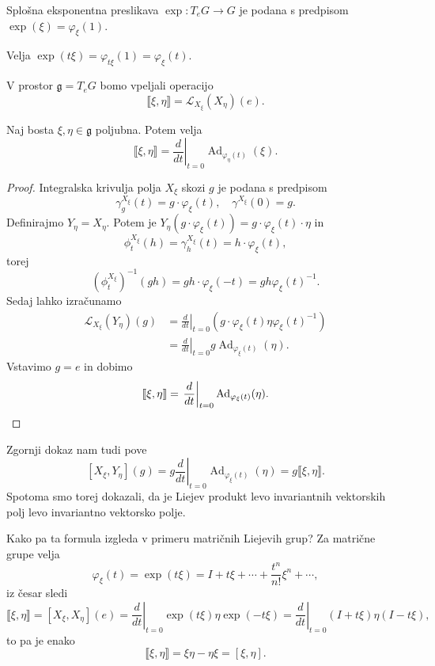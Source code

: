 \begin{definicija}
  Splošna eksponentna preslikava $\exp: T_e G \to G$ je podana s predpisom
  $\exp(\xi) = \varphi_\xi(1)$.
\end{definicija}

\begin{opomba}
  Velja $\exp(t \xi) = \varphi_{t \xi}(1) = \varphi_\xi(t)$.
\end{opomba}

V prostor $\mathfrak{g} = T_e G$ bomo vpeljali operacijo
\[
  \llbracket \xi, \eta \rrbracket
  = \mathcal{L}_{X_\xi} (X_\eta)(e).
\]

\begin{trditev}
  Naj bosta $\xi, \eta \in \mathfrak{g}$ poljubna.
  Potem velja
  \[
	\llbracket \xi, \eta \rrbracket
	= \left. \frac{d}{dt} \right|_{t=0}
	\operatorname{Ad}_{\varphi_\eta(t)}(\xi).
  \]
\end{trditev}

\begin{proof}
  Integralska krivulja polja $X_\xi$ skozi $g$ je podana s predpisom
  \[
	\gamma_g^{X_\xi}(t) = g \cdot \varphi_\xi(t), \quad \gamma^{X_\xi}(0) = g.
  \]
  Definirajmo $Y_\eta = X_\eta$.
  Potem je $Y_\eta(g \cdot \varphi_\xi(t)) = g \cdot \varphi_\xi(t) \cdot \eta$
  in
  \[
	\phi_t^{X_\xi}(h) = \gamma_h^{X_\xi}(t) = h \cdot \varphi_\xi(t),
  \]
  torej
  \[
	(\phi_t^{X_\xi})^{-1} (gh) = gh \cdot \varphi_\xi(-t)
	= gh \varphi_\xi(t)^{-1}.
  \]
  Sedaj lahko izračunamo
  \begin{align*}
	\mathcal{L}_{X_\xi} (Y_\eta)(g)
	&= \left. \frac{d}{dt} \right|_{t=0} \left( g \cdot \varphi_\xi(t) \eta \varphi_\xi(t)^{-1} \right) \\
	&= \left. \frac{d}{dt} \right|_{t=0} g \operatorname{Ad}_{\varphi_\xi(t)} (\eta).
  \end{align*}
  Vstavimo $g = e$ in dobimo
  \[
	\llbracket \xi, \eta \rrbracket
	= \left. \frac{d}{dt} \right|_{t=0} \operatorname{Ad}_{\varphi_\xi(t)}
	(\eta).
	\qedhere
  \]
\end{proof}

Zgornji dokaz nam tudi pove
\[
  [X_\xi, Y_\eta](g)
  = g \left. \frac{d}{dt} \right|_{t=0} \operatorname{Ad}_{\varphi_\xi(t)}(\eta)
  = g \llbracket \xi, \eta \rrbracket.
\]
Spotoma smo torej dokazali, da je Liejev produkt levo invariantnih vektorskih
polj levo invariantno vektorsko polje.

Kako pa ta formula izgleda v primeru matričnih Liejevih grup?
Za matrične grupe velja
\[
  \varphi_\xi(t) = \exp(t\xi) = I + t \xi + \cdots + \frac{t^n}{n!} \xi^n + \cdots,
\]
iz česar sledi
\[
  \llbracket \xi, \eta \rrbracket
  = [X_\xi, X_\eta](e)
  = \left. \frac{d}{dt} \right|_{t=0} \exp(t\xi) \eta \exp(-t \xi)
  = \left. \frac{d}{dt} \right|_{t=0} (I + t \xi) \eta (I - t \xi),
\]
to pa je enako
\[
  \llbracket \xi, \eta \rrbracket
  = \xi \eta - \eta \xi
  = [\xi, \eta].
\]

